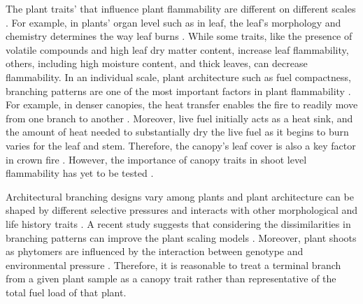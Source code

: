 \documentclass[12pt]{report}
\begin{document}
The plant traits' that influence plant flammability are different on different scales \citep{pausas2017flammability}. For example, in plants' organ level such as in leaf, the leaf's morphology and chemistry determines the way leaf burns \citep{anderson1970forest, owens1998seasonal, schwilk2011scaling, pausas2016secondary, guerrero2021leaf, ganteaume2021volatile,alam2020shoot}. While some traits, like the presence of volatile compounds and high leaf dry matter content, increase leaf flammability, others, including high moisture content, and thick leaves, can decrease flammability. In an individual scale, plant architecture such as fuel compactness, branching patterns are one of the most important factors in plant flammability \citep{schwilk2003flammability, madrigal2012evaluation}. For example, in denser canopies, the heat transfer enables the fire to readily move from one branch to another \citep{bond1996fire}. Moreover, live fuel initially acts as a heat sink, and the amount of heat needed to substantially dry the live fuel as it begins to burn varies for the leaf and stem. Therefore, the canopy's leaf cover is  also a key factor in crown fire \citep{ray2005micrometeorological}. However, the importance of canopy traits in shoot level flammability has yet to be tested \citep{alam2020shoot}.



Architectural branching designs vary among plants \citep{halle2012tropical} and plant architecture can be shaped by different selective pressures \citep{danell1994browseeffects, schwilk2003flammability} and interacts with other morphological and life history traits \citep{ackerly1998leaf, schwilk2001flammability,archibald2003growing}. A recent study suggests that considering the dissimilarities in branching patterns can improve the plant scaling models \citep{bentley2013empirical}. Moreover, plant shoots as phytomers are influenced by the interaction between genotype and environmental pressure \citep{mcsteen2005shoot, wang2008molecular}. Therefore, it is reasonable to treat a terminal branch from a given plant sample as a canopy trait rather than representative of the total fuel load of that plant.

\end{document}
